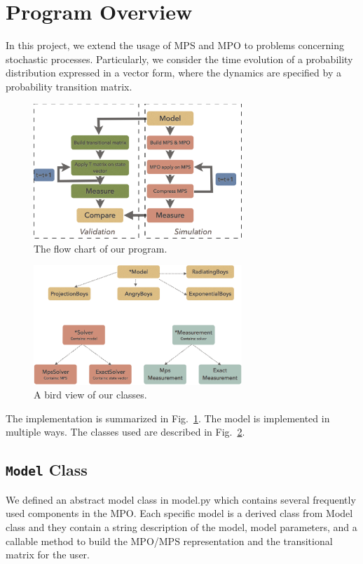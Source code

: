 \documentclass[english]{article}[12pt]
\begin{document}
\section{Program Overview}
In this project, we extend the usage of MPS and MPO to problems concerning stochastic processes. Particularly, we  consider the time evolution of a probability distribution expressed in a vector form, where the dynamics are specified by a probability transition matrix.

\begin{figure}[htbp]
\begin{center}
\includegraphics[width=0.7\textwidth]{flow_chart_new.pdf}
\caption{The flow chart of our program.}
\label{fig:flow_chart}
\end{center}
\end{figure}

\begin{figure}[htbp]
\begin{center}
\includegraphics[width=0.7\textwidth]{class_diagram_new.pdf}
\caption{A bird view of our classes.}
\label{fig:class_diagram}
\end{center}
\end{figure}


The implementation is summarized in Fig.~\ref{fig:flow_chart}. The model is implemented in multiple ways. The classes used are described in Fig.~\ref{fig:class_diagram}.
\subsection{\texttt{Model} Class}
We defined an abstract model class in model.py which contains several frequently used components in the MPO. Each specific model is a derived class from Model class and they contain a string description of the model, model parameters, and a callable method to build the MPO/MPS representation and the transitional matrix for the user.
\end{document}
